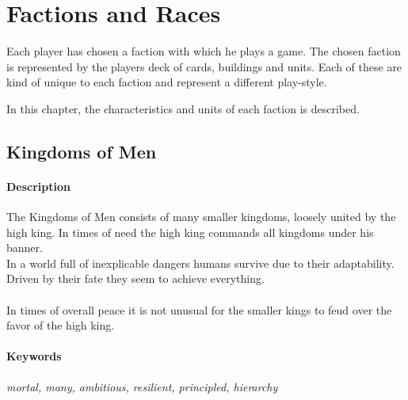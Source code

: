 \documentclass[a5paper,pagesize,10pt,bibtotoc,pointlessnumbers,
normalheadings,DIV=9,twoside=false]{scrbook}
\begin{document}
\chapter{Factions and Races}
Each player has chosen a faction with which he plays a game. The chosen faction is represented by the players deck of cards, buildings and units. Each of these are kind of unique to each faction and represent a different play-style.

In this chapter, the characteristics and units of each faction is described.
\newpage
\section{Kingdoms of Men}

\subsubsection{Description}
The Kingdoms of Men consists of many smaller kingdoms, loosely united by the high king. In times of need the high king commands all kingdoms under his banner.\\
In a world full of inexplicable dangers humans survive due to their adaptability. Driven by their fate they seem to achieve everything.\\
\\
In times of overall peace it is not unusual for the smaller kings to feud over the favor of the high king.

\subsubsection{Keywords}
\emph{mortal, many, ambitious, resilient, principled, hierarchy}
\end{document}
